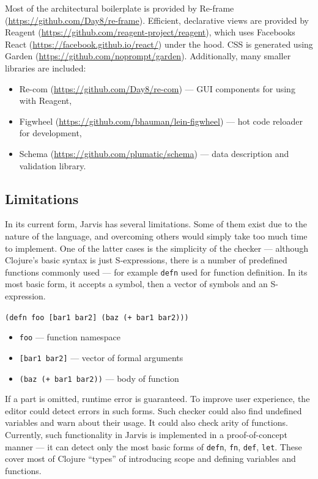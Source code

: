 \documentclass[11pt]{scrartcl}
\begin{document}
Most of the architectural boilerplate is provided by Re-frame
(\url{https://github.com/Day8/re-frame}).
Efficient, declarative views are provided by Reagent
(\url{https://github.com/reagent-project/reagent}), which uses Facebooks React
(\url{https://facebook.github.io/react/}) under the hood.
CSS is generated using Garden (\url{https://github.com/noprompt/garden}).
Additionally, many smaller libraries are included:
\begin{itemize}
  \item Re-com (\url{https://github.com/Day8/re-com}) --- GUI components for using with
    Reagent,
    
  \item Figwheel (\url{https://github.com/bhauman/lein-figwheel}) --- hot code
    reloader for development,
    
  \item Schema (\url{https://github.com/plumatic/schema}) --- data description and
    validation library.
    
\end{itemize}

\subsection{Limitations}
In its current form, Jarvis has several limitations.
Some of them exist due to the nature of the language, and overcoming others
would simply take too much time to implement.
One of the latter cases is the simplicity of the checker --- although Clojure’s
basic syntax is just S-expressions, there is a number of predefined functions
commonly used --- for example \lstinline|defn| used for function definition.
In its most basic form, it accepts a symbol, then a vector of symbols and an
S-expression.

\vspace{5mm}
\texttt{(defn \colorbox{blue!30}{foo} \colorbox{green!20}{[bar1 bar2]} \colorbox{red!10}{(baz (+ bar1 bar2))})}
\begin{itemize}
  \item \texttt{\colorbox{blue!30}{foo}} --- function namespace
  \item \texttt{\colorbox{green!20}{[bar1 bar2]}} --- vector of formal arguments
  \item \texttt{\colorbox{red!10}{(baz (+ bar1 bar2))}} --- body of function
\end{itemize}
\vspace{5mm}

If a part is omitted, runtime error is guaranteed.
To improve user experience, the editor could detect errors in such forms.
Such checker could also find undefined variables and warn about their usage.
It could also check arity of functions.
Currently, such functionality in Jarvis is implemented in a proof-of-concept
manner --- it can detect only the most basic forms of \lstinline|defn|,
\lstinline|fn|, \lstinline|def|, \lstinline|let|. These cover most of Clojure
“types” of introducing scope and defining variables and functions.
\end{document}
